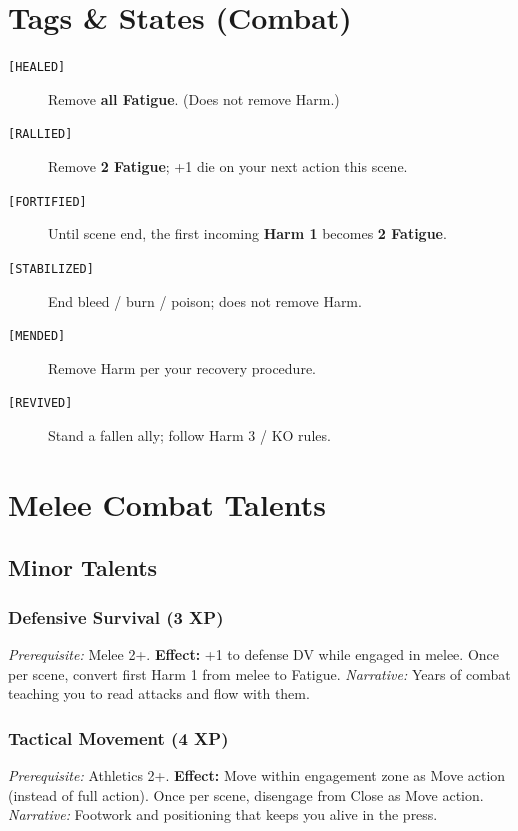 \section{Tags \& States (Combat)}\label{sec:tags_states_ref}
\begin{description}
    \item[\texttt{[HEALED]}] Remove \textbf{all Fatigue}. (Does not remove Harm.)
    \item[\texttt{[RALLIED]}] Remove \textbf{2 Fatigue}; +1 die on your next action this scene.
    \item[\texttt{[FORTIFIED]}] Until scene end, the first incoming \textbf{Harm 1} becomes \textbf{2 Fatigue}.
    \item[\texttt{[STABILIZED]}] End bleed / burn / poison; does not remove Harm.
    \item[\texttt{[MENDED]}] Remove Harm per your recovery procedure.
    \item[\texttt{[REVIVED]}] Stand a fallen ally; follow Harm 3 / KO rules.
\end{description}

\section{Melee Combat Talents}\label{sec:melee_talents}

\subsection{Minor Talents}

\subsubsection{Defensive Survival (3 XP)}\label{talent:defensive_survival}
\textit{Prerequisite:} Melee 2+.
\textbf{Effect:} +1 to defense DV while engaged in melee. Once per scene, convert first Harm 1 from melee to Fatigue.
\textit{Narrative:} Years of combat teaching you to read attacks and flow with them.

\subsubsection{Tactical Movement (4 XP)}\label{talent:tactical_movement}
\textit{Prerequisite:} Athletics 2+.
\textbf{Effect:} Move within engagement zone as Move action (instead of full action). Once per scene, disengage from Close as Move action.
\textit{Narrative:} Footwork and positioning that keeps you alive in the press.

